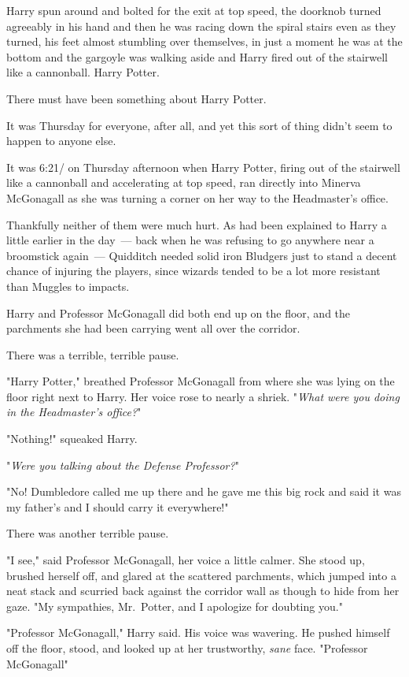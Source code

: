 Harry spun around and bolted for the exit at top speed, the doorknob turned
agreeably in his hand and then he was racing down the spiral stairs even as
they turned, his feet almost stumbling over themselves, in just a moment he was
at the bottom and the gargoyle was walking aside and Harry fired out of the
stairwell like a cannonball.
\sbreak
Harry Potter.

There must have been something about Harry Potter.

It was Thursday for everyone, after all, and yet this sort of thing didn't seem
to happen to anyone else.

It was 6:21\PM/ on Thursday afternoon when Harry Potter, firing out of the
stairwell like a cannonball and accelerating at top speed, ran directly into
Minerva McGonagall as she was turning a corner on her way to the Headmaster's
office.

Thankfully neither of them were much hurt. As had been explained to Harry a
little earlier in the day~--- back when he was refusing to go anywhere near a
broomstick again~--- Quidditch needed solid iron Bludgers just to stand a decent
chance of injuring the players, since wizards tended to be a lot more resistant
than Muggles to impacts.

Harry and Professor McGonagall did both end up on the floor, and the parchments
she had been carrying went all over the corridor.

There was a terrible, terrible pause.

"Harry Potter," breathed Professor McGonagall from where she was lying on the
floor right next to Harry. Her voice rose to nearly a shriek. "\emph{What were
you doing in the Headmaster's office?}"

"Nothing!" squeaked Harry.

"\emph{Were you talking about the Defense Professor?}"

"No! Dumbledore called me up there and he gave me this big rock and said it was
my father's and I should carry it everywhere!"

There was another terrible pause.

"I see," said Professor McGonagall, her voice a little calmer. She stood up,
brushed herself off, and glared at the scattered parchments, which jumped into
a neat stack and scurried back against the corridor wall as though to hide from
her gaze. "My sympathies, Mr.~Potter, and I apologize for doubting you."

"Professor McGonagall," Harry said. His voice was wavering. He pushed himself
off the floor, stood, and looked up at her trustworthy, \emph{sane} face.
"Professor McGonagall{\el}"

